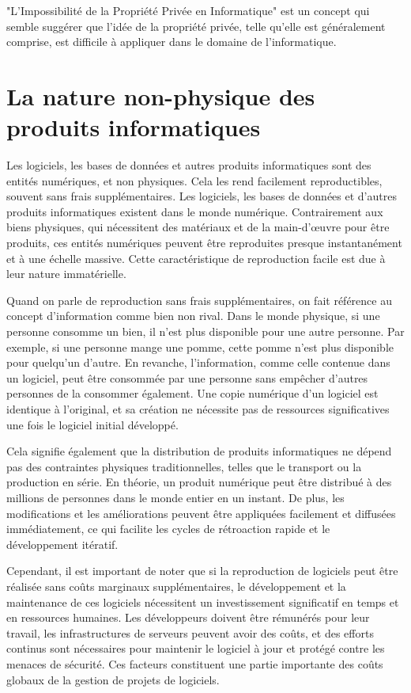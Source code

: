 "L’Impossibilité de la Propriété Privée en Informatique" est un concept qui semble suggérer que l'idée de la propriété privée, telle qu'elle est généralement comprise, est difficile à appliquer dans le domaine de l'informatique.\\

\section{La nature non-physique des produits informatiques} 
Les logiciels, les bases de données et autres produits informatiques sont des entités numériques, et non physiques. Cela les rend facilement reproductibles, souvent sans frais supplémentaires.
Les logiciels, les bases de données et d'autres produits informatiques existent dans le monde numérique. Contrairement aux biens physiques, qui nécessitent des matériaux et de la main-d'œuvre pour être produits, ces entités numériques peuvent être reproduites presque instantanément et à une échelle massive. Cette caractéristique de reproduction facile est due à leur nature immatérielle.

Quand on parle de reproduction sans frais supplémentaires, on fait référence au concept d'information comme bien non rival. Dans le monde physique, si une personne consomme un bien, il n'est plus disponible pour une autre personne. Par exemple, si une personne mange une pomme, cette pomme n'est plus disponible pour quelqu'un d'autre. En revanche, l'information, comme celle contenue dans un logiciel, peut être consommée par une personne sans empêcher d'autres personnes de la consommer également. Une copie numérique d'un logiciel est identique à l'original, et sa création ne nécessite pas de ressources significatives une fois le logiciel initial développé.

Cela signifie également que la distribution de produits informatiques ne dépend pas des contraintes physiques traditionnelles, telles que le transport ou la production en série. En théorie, un produit numérique peut être distribué à des millions de personnes dans le monde entier en un instant. De plus, les modifications et les améliorations peuvent être appliquées facilement et diffusées immédiatement, ce qui facilite les cycles de rétroaction rapide et le développement itératif.

Cependant, il est important de noter que si la reproduction de logiciels peut être réalisée sans coûts marginaux supplémentaires, le développement et la maintenance de ces logiciels nécessitent un investissement significatif en temps et en ressources humaines. Les développeurs doivent être rémunérés pour leur travail, les infrastructures de serveurs peuvent avoir des coûts, et des efforts continus sont nécessaires pour maintenir le logiciel à jour et protégé contre les menaces de sécurité. Ces facteurs constituent une partie importante des coûts globaux de la gestion de projets de logiciels.

